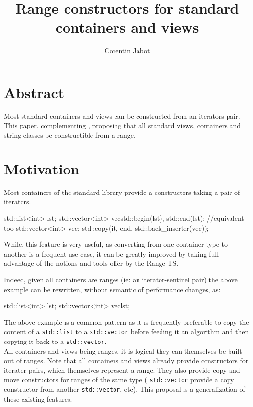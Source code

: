 \documentclass{wg21}
\title{Range constructors for standard containers and views}
\author{Corentin Jabot}{corentin.jabot@gmail.com}
\newcommand{\cc}[1]{\texttt{#1}}
\begin{document}
\maketitle

\section{Abstract}
Most standard containers and views can be constructed from an iterators-pair.
This paper, complementing \cite{P0896R3}, proposing that all standard views,
containers and string classes be constructible from a range.


\section{Motivation}

Most containers of the standard library provide a constructors taking a pair of iterators.

\begin{codeblock}
	std::list<int> lst;
	std::vector<int> vec{std::begin(lst), std::end(lst)};
	//equivalent too
	std::vector<int> vec;
	std::copy(it, end, std::back_inserter(vec));
\end{codeblock}

While, this feature is very useful, as converting from one container type to another is a frequent
use-case, it can be greatly improved by taking full advantage of the notions and tools offer by the Range TS.

Indeed, given all containers are ranges (ie: an iterator-sentinel pair) the above example can be rewritten, without semantic of performance changes, as:

\begin{codeblock}
	std::list<int> lst;
	std::vector<int> vec{lst};
\end{codeblock}


The above example is a common pattern as it is frequently preferable to copy the content of a \cc{std::list} to 
a \cc{std::vector} before feeding it an algorithm and then copying it back to a \cc{std::vector}.\\

All containers and views being ranges, it is logical they can themselves be built out of ranges.
Note that all containers and views already provide constructors for iterator-pairs, which themselves represent a range.
They also provide copy and move constructors for ranges of the same type ( \cc{std::vector} provide a copy constructor from another \cc{std::vector}, etc).
This proposal is a generalization of these existing features.
\end{document}
